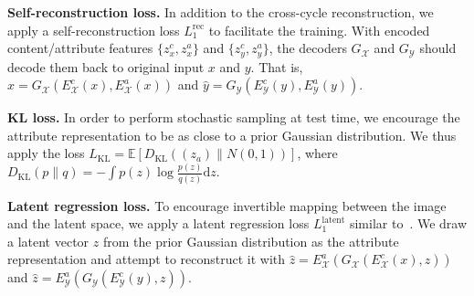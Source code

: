 \documentclass[runningheads]{llncs}
\begin{document}
\noindent \textbf{Self-reconstruction loss.}
In addition to the cross-cycle reconstruction, we apply a self-reconstruction loss $L_1^{\mathrm{rec}}$ to facilitate the training. 
%
With encoded content/attribute features $\{z_x^c, z_x^a\}$ and $\{z_y^c, z_y^a\}$, the decoders $G_\mathcal{X}$ and $G_\mathcal{Y}$ should decode them back to original input $x$ and $y$.
%
That is, $\hat{x} = G_\mathcal{X}(E_\mathcal{X}^c(x),E_\mathcal{X}^a(x) )$ and $\hat{y} = G_\mathcal{Y}(E_\mathcal{Y}^c(y),E_\mathcal{Y}^a(y) )$.
%

\noindent \textbf{KL loss.}
In order to perform stochastic sampling at test time, we encourage the attribute representation to be as close to a prior Gaussian distribution.  
%
We thus apply the loss $L_{\mathrm{KL}}= \mathbb{E}[D_{\mathrm{KL}}((z_a)\|N(0,1))]$, where $D_{\mathrm{KL}}(p\|q)=-\int{p(z)\log{\frac{p(z)}{q(z)}}\mathrm{d}z}$.

\noindent \textbf{Latent regression loss.}
To encourage invertible mapping between the image and the latent space, we apply a latent regression loss $L_1^{\mathrm{latent}}$ similar to~\cite{zhu2017bicyclegan}. 
%
We draw a latent vector $z$ from the prior Gaussian distribution as the attribute representation and attempt to reconstruct it with $\hat{z}=E_\mathcal{X}^a(G_\mathcal{X}(E_\mathcal{X}^c(x),z))$ and $\hat{z}=E_\mathcal{Y}^a(G_\mathcal{Y}(E_\mathcal{Y}^c(y),z))$.
%
%
%
%
\end{document}
